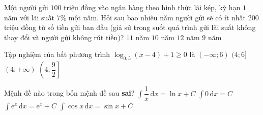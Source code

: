 \begin{ex}%
Một người gửi $100$ triệu đồng vào ngân hàng theo hình thức lãi kép, kỳ hạn $1$ năm với lãi suất $7$\% một năm. Hỏi sau bao nhiêu năm người gửi sẽ có ít nhất $200$ triệu đồng từ số tiền gửi ban đầu (giả sử trong suốt quá trình gửi lãi suất không thay đổi và người gửi không rút tiền)?
\choice
{\True $11$ năm}
{$10$ năm}
{$12$ năm}
{$9$ năm}
\end{ex}
\begin{ex}%
Tập nghiệm của bất phương trình $\log_{0{,}5}(x-4)+1\ge 0$ là
\choice
{$(-\infty ;6)$}
{\True $(4;6]$}
{$(4;+\infty )$}
{$\left(4;\dfrac{9}{2}\right]$}
\end{ex}
\begin{ex}%
Mệnh đề nào trong bốn mệnh đề sau {\bf sai}?
\choice
{\True $\displaystyle\int\dfrac{1}{x}\mathrm{\,d}x=\ln x+C$	}
{$\displaystyle\int 0 \mathrm{\,d}x=C$}
{$\displaystyle\int \mathrm{e}^x\mathrm{\,d}x=\mathrm{e}^x+C$}
{$\displaystyle\int\cos x\mathrm{\,d}x=\sin x+C$}
\end{ex}
